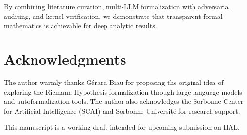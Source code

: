 \documentclass[11pt,a4paper]{article}
\theoremstyle{plain}
\theoremstyle{definition}
\theoremstyle{remark}
\begin{document}
By combining literature curation, multi-LLM formalization with adversarial auditing, and kernel verification, we demonstrate that transparent formal mathematics is achievable for deep analytic results.

\section*{Acknowledgments}

The author warmly thanks G\'erard Biau for proposing the original idea of exploring the Riemann Hypothesis formalization through large language models and autoformalization tools. The author also acknowledges the Sorbonne Center for Artificial Intelligence (SCAI) and Sorbonne Universit\'e for research support.

This manuscript is a working draft intended for upcoming submission on HAL.
\end{document}
